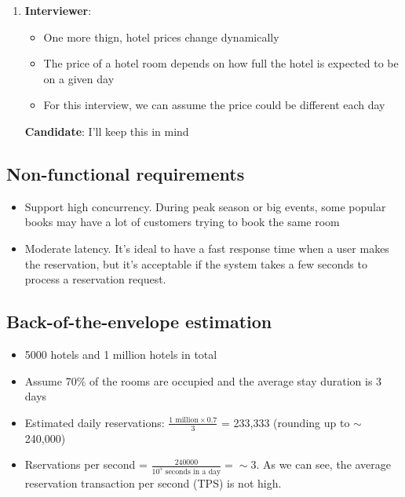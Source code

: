 \documentclass{report}
\theoremstyle{definition}
\let\oldsubsection\subsection
\renewcommand{\subsection}{\oldsubsection*}
\begin{document}
\begin{enumerate}
\textbf{Interviewer}: Sounds good.

\item
\textbf{Interviewer}:

\begin{itemize}
\item
One more thign, hotel prices change dynamically
\item
The price of a hotel room depends on how full the hotel is expected to be on a given day
\item
For this interview, we can assume the price could be different each day
\end{itemize}

\textbf{Candidate}: I'll keep this in mind
\end{enumerate}

\subsection{Non-functional requirements}

\begin{itemize}
\item
Support high concurrency. During peak season or big events, some popular books may have a lot of customers trying to book the same room
\item
Moderate latency. It's ideal to have a fast response time when a user makes the reservation, but it's acceptable if the system takes a few seconds to process a reservation request.
\end{itemize}

\subsection{Back-of-the-envelope estimation}

\begin{itemize}
\item
5000 hotels and 1 million hotels in total
\item
Assume 70\% of the rooms are occupied and the average stay duration is 3 days
\item
Estimated daily reservations: $\frac{1 \text{ million} \times 0.7}{3}$ = 233,333 (rounding up to $\sim$ 240,000)
\item
Rservations per second = $\frac{240000}{10^{5} \text{ seconds in a day}} = \sim 3$. As we can see, the average reservation transaction per second (TPS) is not high.
\end{itemize}
\end{document}
